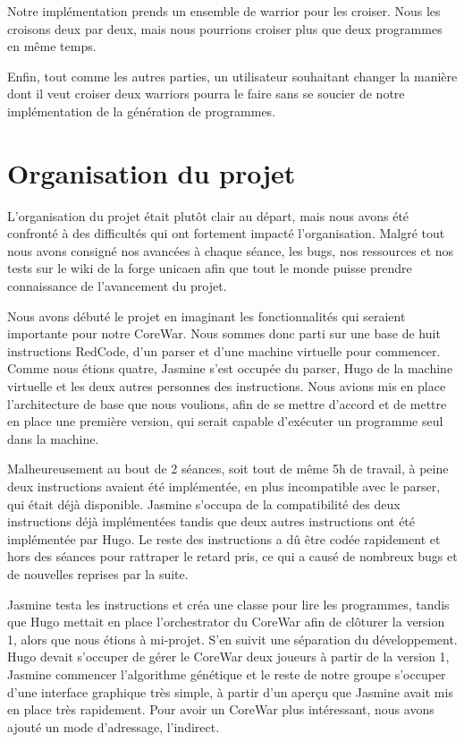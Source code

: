 \documentclass[hidelinks]{report}
\begin{document}
Notre implémentation prends un ensemble de warrior pour les croiser. Nous les croisons deux par deux, mais nous pourrions croiser plus que deux programmes en même temps.

Enfin, tout comme les autres parties, un utilisateur souhaitant changer la manière dont il veut croiser deux warriors pourra le faire sans se soucier de notre implémentation de la génération de programmes.


\section{Organisation du projet}

L'organisation du projet était plutôt clair au départ, mais nous avons été confronté à des difficultés qui ont fortement impacté l'organisation. Malgré tout nous avons consigné nos avancées à chaque séance, les bugs, nos ressources et nos tests sur le wiki de la forge unicaen afin que tout le monde puisse prendre connaissance de l'avancement du projet.

Nous avons débuté le projet en imaginant les fonctionnalités qui seraient importante pour notre CoreWar. Nous sommes donc parti sur une base de huit instructions RedCode, d'un parser et d'une machine virtuelle pour commencer. Comme nous étions quatre, Jasmine s'est occupée du parser, Hugo de la machine virtuelle et les deux autres personnes des instructions. Nous avions mis en place l'architecture de base que nous voulions, afin de se mettre d'accord et de mettre en place une première version, qui serait capable d'exécuter un programme seul dans la machine.

Malheureusement au bout de 2 séances, soit tout de même 5h de travail, à peine deux instructions avaient été implémentée, en plus incompatible avec le parser, qui était déjà disponible. Jasmine s'occupa de la compatibilité des deux instructions déjà implémentées tandis que deux autres instructions ont été implémentée par Hugo. Le reste des instructions a dû être codée rapidement et hors des séances pour rattraper le retard pris, ce qui a causé de nombreux bugs et de nouvelles reprises par la suite.

Jasmine testa les instructions et créa une classe pour lire les programmes, tandis que Hugo mettait en place l'orchestrator du CoreWar afin de clôturer la version 1, alors que nous étions à mi-projet. S'en suivit une séparation du développement. Hugo devait s'occuper de gérer le CoreWar deux joueurs à partir de la version 1, Jasmine commencer l'algorithme génétique et le reste de notre groupe s'occuper d'une interface graphique très simple, à partir d'un aperçu que Jasmine avait mis en place très rapidement. Pour avoir un CoreWar plus intéressant, nous avons  ajouté un mode d'adressage, l'indirect.
\end{document}
